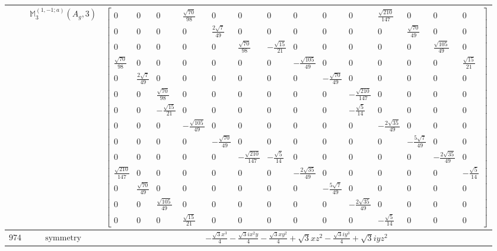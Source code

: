 \documentclass[fleqn,8pt,landscape]{jsarticle}
\begin{document}
\begin{longtable}{ccc}
$  $ & $ \mathbb{M}_{3}^{(1,-1;a)}(A_{g},3) $ & $ \begin{bmatrix} 0 & 0 & 0 & \frac{\sqrt{70}}{98} & 0 & 0 & 0 & 0 & 0 & 0 & \frac{\sqrt{210}}{147} & 0 & 0 & 0 \\ 0 & 0 & 0 & 0 & \frac{2 \sqrt{7}}{49} & 0 & 0 & 0 & 0 & 0 & 0 & \frac{\sqrt{70}}{49} & 0 & 0 \\ 0 & 0 & 0 & 0 & 0 & \frac{\sqrt{70}}{98} & - \frac{\sqrt{15}}{21} & 0 & 0 & 0 & 0 & 0 & \frac{\sqrt{105}}{49} & 0 \\ \frac{\sqrt{70}}{98} & 0 & 0 & 0 & 0 & 0 & 0 & - \frac{\sqrt{105}}{49} & 0 & 0 & 0 & 0 & 0 & \frac{\sqrt{15}}{21} \\ 0 & \frac{2 \sqrt{7}}{49} & 0 & 0 & 0 & 0 & 0 & 0 & - \frac{\sqrt{70}}{49} & 0 & 0 & 0 & 0 & 0 \\ 0 & 0 & \frac{\sqrt{70}}{98} & 0 & 0 & 0 & 0 & 0 & 0 & - \frac{\sqrt{210}}{147} & 0 & 0 & 0 & 0 \\ 0 & 0 & - \frac{\sqrt{15}}{21} & 0 & 0 & 0 & 0 & 0 & 0 & - \frac{\sqrt{5}}{14} & 0 & 0 & 0 & 0 \\ 0 & 0 & 0 & - \frac{\sqrt{105}}{49} & 0 & 0 & 0 & 0 & 0 & 0 & - \frac{2 \sqrt{35}}{49} & 0 & 0 & 0 \\ 0 & 0 & 0 & 0 & - \frac{\sqrt{70}}{49} & 0 & 0 & 0 & 0 & 0 & 0 & - \frac{5 \sqrt{7}}{49} & 0 & 0 \\ 0 & 0 & 0 & 0 & 0 & - \frac{\sqrt{210}}{147} & - \frac{\sqrt{5}}{14} & 0 & 0 & 0 & 0 & 0 & - \frac{2 \sqrt{35}}{49} & 0 \\ \frac{\sqrt{210}}{147} & 0 & 0 & 0 & 0 & 0 & 0 & - \frac{2 \sqrt{35}}{49} & 0 & 0 & 0 & 0 & 0 & - \frac{\sqrt{5}}{14} \\ 0 & \frac{\sqrt{70}}{49} & 0 & 0 & 0 & 0 & 0 & 0 & - \frac{5 \sqrt{7}}{49} & 0 & 0 & 0 & 0 & 0 \\ 0 & 0 & \frac{\sqrt{105}}{49} & 0 & 0 & 0 & 0 & 0 & 0 & - \frac{2 \sqrt{35}}{49} & 0 & 0 & 0 & 0 \\ 0 & 0 & 0 & \frac{\sqrt{15}}{21} & 0 & 0 & 0 & 0 & 0 & 0 & - \frac{\sqrt{5}}{14} & 0 & 0 & 0 \end{bmatrix} $ \\ \hline
$ 974 $ & $ \text{symmetry} $ & $ - \frac{\sqrt{3} x^{3}}{4} - \frac{\sqrt{3} i x^{2} y}{4} - \frac{\sqrt{3} x y^{2}}{4} + \sqrt{3} x z^{2} - \frac{\sqrt{3} i y^{3}}{4} + \sqrt{3} i y z^{2} $ \\

\end{longtable}
\end{document}
